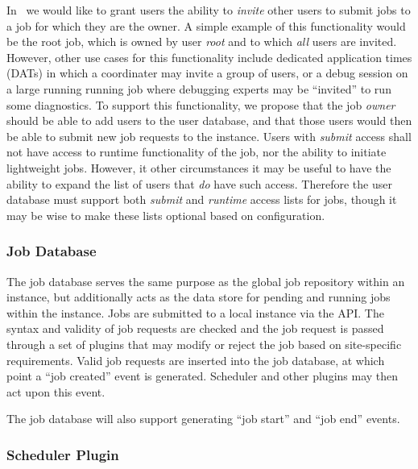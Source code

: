 In \ngrm\ we would like to grant users the ability to \emph{invite}
other users to submit jobs to a job for which they are the owner.
A simple example of this functionality would be the root job,
which is owned by user \emph{root} and to which \emph{all} users
are invited. However, other use cases for this functionality
include dedicated application times (DATs) in which a coordinater
may invite a group of users, or a debug session on a large running
running job where debugging experts may be ``invited'' to run some
diagnostics. To support this functionality, we propose that the job
\emph{owner} should be able to add users to the user database, and
that those users would then be able to submit new job requests to
the instance. Users with \emph{submit} access shall not have access
to runtime functionality of the job, nor the ability to initiate
lightweight jobs. However, it other circumstances it may be useful
to have the ability to expand the list of users that \emph{do}
have such access.  Therefore the user database must support both
\emph{submit} and \emph{runtime} access lists for jobs, though it
may be wise to make these lists optional based on configuration.


\subsubsection{Job Database}
\label{sec:jobdatabase}

The job database serves the same purpose as the global job repository
within an instance, but additionally acts as the data store for pending
and running jobs within the instance. Jobs are submitted to a local
instance via the API. The syntax and validity of job requests are checked
and the job request is passed through a set of plugins that may modify
or reject the job based on site-specific requirements. Valid job
requests are inserted into the job database, at which point a
``job created'' event is generated. Scheduler and other plugins may
then act upon this event.

The job database will also support generating ``job start'' and ``job end''
events.
\ifcomments
{} \fi

\subsubsection{Scheduler Plugin}

